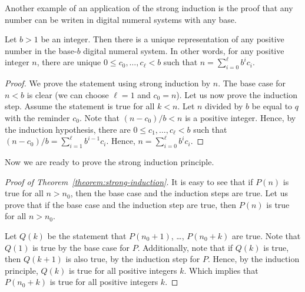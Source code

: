 Another example of an application of the strong induction is the proof that
any number can be writen in digital numeral systems with any base.
\begin{theorem}
  Let $b > 1$ be an integer. Then there is a unique representation of any
  positive number in the base-$b$ digital numeral system. In other words, for
  any positive integer $n$, there are unique $0 \le c_0, \dots, c_\ell < b$
  such that $n = \sum_{i = 0}^\ell b^i c_i$.
\end{theorem}
\begin{proof}
  We prove the statement using strong induction by $n$. The base case for
  $n < b$ is clear (we can choose $\ell = 1$ and $c_0 = n$).
  Let us now prove the induction step. Assume the statement is true for all
  $k < n$. Let $n$ divided by $b$ be equal to $q$ with the reminder $c_0$.
  Note that $(n - c_0) / b < n$ is a positive integer. Hence,
  by the induction hypothesis, there are
  $0 \le c_1, \dots, c_\ell < b$
  such that $(n - c_0) / b = \sum_{i = 1}^\ell b^{i - 1} c_i$. Hence,
  $n = \sum_{i = 0}^\ell b^i c_i$.
\end{proof}


Now we are ready to prove the strong induction principle.
\begin{proof}[Proof of Theorem~\ref{theorem:strong-induction}]
    It is easy to see that if $P(n)$ is true for all $n > n_0$, then the base
    case and the induction steps are true. Let us prove that if the base case and
    the induction step are true, then $P(n)$ is true for all $n > n_0$.

    Let $Q(k)$ be the statement that $P(n_0 + 1)$, \dots, $P(n_0 + k)$ are true.
    Note that $Q(1)$ is true by the base case for $P$. Additionally, note that if
    $Q(k)$ is true, then $Q(k + 1)$ is also true, by the induction step for $P$.
    Hence, by the induction principle, $Q(k)$ is true for all positive integers
    $k$. Which implies that $P(n_0 + k)$ is true for all positive integers $k$.
\end{proof}


